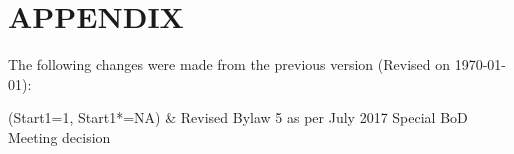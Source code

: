\documentclass[12pt]{article}
\begin{document}
\appendix
\titleformat{\section}{\centering\bfseries\large\uppercase}{}{0ex}{}
\section{APPENDIX}
The following changes were made from the previous version (Revised on \today):
\begin{easylist}
\ListProperties(Start1=1, Start1*=NA)
& Revised Bylaw 5 as per July 2017 Special BoD Meeting decision
\end{easylist}
\end{document}
